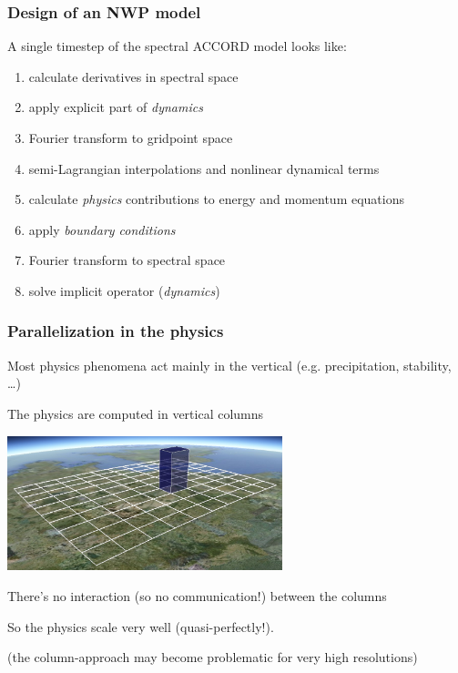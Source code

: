 \documentclass[aspectratio=43,9pt]{beamer}
\begin{document}
%
%
\begin{frame}
	\frametitle{Design of an NWP model}
	A single timestep of the spectral ACCORD model looks like:
	\begin{enumerate}\vspace*{2ex}\setlength\itemsep{2ex}
		\item calculate derivatives in spectral space
		\item apply explicit part of \emph{dynamics}
		\item Fourier transform to gridpoint space
		\item semi-Lagrangian interpolations and nonlinear dynamical terms
		\item calculate \emph{physics} contributions to energy and momentum equations
		\item apply \emph{boundary conditions}
		\item Fourier transform to spectral space
		\item solve implicit operator (\emph{dynamics})
	\end{enumerate}	
\end{frame}
%
%
\begin{frame}
	\frametitle{Parallelization in the physics}
	\begin{myitemize}{2ex}
		\item Most physics phenomena act mainly in the vertical (e.g. precipitation, stability, \ldots)
		\item The physics are computed in vertical columns
			\begin{center}
				\includegraphics[width=8cm]{column}
			\end{center}
		\item There's no interaction (so no communication!) between the columns
		\item So the physics scale very well (quasi-perfectly!).
		\item (the column-approach may become problematic for very high resolutions)
	\end{myitemize}
\end{frame}
\end{document}
